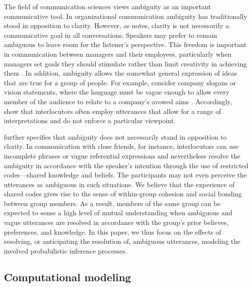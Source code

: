 \documentclass[10pt,a4paper]{article}
\newcommand{\gcs}[1]{\textcolor{blue}{[gcs: #1]}}
\begin{document}
The field of communication sciences views ambiguity as an important communicative tool. %
In organizational communication ambiguity has traditionally stood in opposition to clarity. However, as  notes, clarity is not necessarily a communicative goal in all conversations. Speakers may prefer to remain ambiguous to leave room for the listener's perspective. This freedom is important in communication between managers and their employees, particularly when managers set goals they should stimulate rather than limit creativity in achieving them \cite{mohr1983implications}.
In addition, ambiguity allows the somewhat general expression of ideas that are true for a group of people. 
For example, consider company slogans or vision statements, where the language must be vague enough to allow every member of the audience to relate to a company's avowed aims \cite{carmon2013}. 
Accordingly,  show that interlocutors often employ utterances that allow for a range of interpretations and do not enforce a particular viewpoint.

 further specifies that ambiguity does not necessarily stand in opposition to clarity. In communication with close friends, for instance, interlocutors can use incomplete phrases or vague referential expressions and nevertheless resolve the ambiguity in accordance with the speaker's intention through the use of restricted codes---shared knowledge and beliefs. The participants may not even perceive the utterances as ambiguous in such situations. We believe that the experience of shared codes gives rise to the sense of within-group cohesion and social bonding between group members.
As a result, members of the same group can be expected to sense a high level of mutual understanding when ambiguous and vague utterances are resolved in accordance with the group's prior believes, preferences, and knowledge.
In this paper, we thus focus on the effects of resolving, or anticipating the resolution of, ambiguous utterances, modeling the involved probabilistic inference processes. 



\subsection{Computational modeling}
\end{document}
